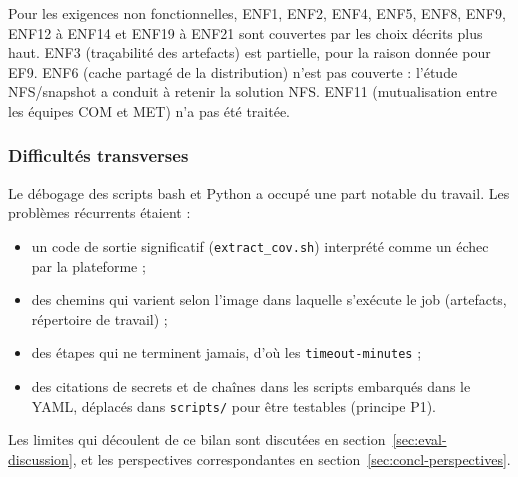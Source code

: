 Pour les exigences non fonctionnelles, ENF1, ENF2, ENF4, ENF5, ENF8, ENF9,
ENF12 à ENF14 et ENF19 à ENF21 sont couvertes par les choix décrits plus haut.
ENF3 (traçabilité des artefacts) est partielle, pour la raison donnée pour
EF9. ENF6 (cache partagé de la distribution) n'est pas couverte : l'étude
NFS/snapshot a conduit à retenir la solution NFS. ENF11 (mutualisation entre les équipes COM et
MET) n'a pas été traitée.

\subsubsection{Difficultés transverses}

Le débogage des scripts bash et Python a occupé une part notable du travail.
Les problèmes récurrents étaient :

\begin{itemize}[nosep]
  \item un code de sortie significatif (\texttt{extract\_cov.sh}) interprété comme un
        échec par la plateforme ;
  \item des chemins qui varient selon l'image dans laquelle s'exécute le job
        (artefacts, répertoire de travail) ;
  \item des étapes qui ne terminent jamais, d'où les \texttt{timeout-minutes} ;
  \item des citations de secrets et de chaînes dans les scripts embarqués dans le YAML,
        déplacés dans \texttt{scripts/} pour être testables (principe P1).
\end{itemize}

Les limites qui découlent de ce bilan sont discutées en
section~\ref{sec:eval-discussion}, et les perspectives correspondantes en
section~\ref{sec:concl-perspectives}.

